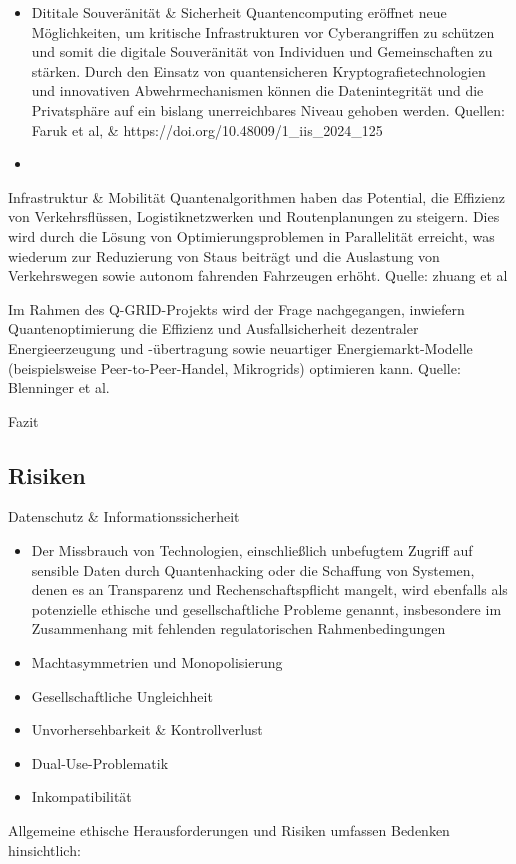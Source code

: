 \begin{itemize}
\begin{itemize}
\end{itemize}
\item Dititale Souveränität & Sicherheit
Quantencomputing eröffnet neue Möglichkeiten, um kritische Infrastrukturen vor Cyberangriffen zu schützen und somit die digitale Souveränität von Individuen und Gemeinschaften zu stärken. Durch den Einsatz von quantensicheren Kryptografietechnologien und innovativen Abwehrmechanismen können die Datenintegrität und die Privatsphäre auf ein bislang unerreichbares Niveau gehoben werden.  Quellen: Faruk et al, & https://doi.org/10.48009/1_iis_2024_125
\item 


\end{itemize}
\item Infrastruktur \& Mobilität
Quantenalgorithmen haben das Potential, die Effizienz von Verkehrsflüssen, Logistiknetzwerken und Routenplanungen zu steigern. Dies wird durch die Lösung von Optimierungsproblemen in Parallelität erreicht, was wiederum zur Reduzierung von Staus beiträgt und die Auslastung von Verkehrswegen sowie autonom fahrenden Fahrzeugen erhöht. Quelle: zhuang et al

Im Rahmen des Q-GRID-Projekts wird der Frage nachgegangen, inwiefern Quantenoptimierung die Effizienz und Ausfallsicherheit dezentraler Energieerzeugung und -übertragung sowie neuartiger Energiemarkt-Modelle (beispielsweise Peer-to-Peer-Handel, Mikrogrids) optimieren kann. Quelle: Blenninger et al. 


\item Fazit


\subsection{Risiken}
Datenschutz \& Informationssicherheit
\begin{itemize}
    \item Der Missbrauch von Technologien, einschließlich unbefugtem Zugriff auf sensible Daten durch Quantenhacking oder die Schaffung von Systemen, denen es an Transparenz und Rechenschaftspflicht mangelt, wird ebenfalls als potenzielle ethische und gesellschaftliche Probleme genannt, insbesondere im Zusammenhang mit fehlenden regulatorischen Rahmenbedingungen \cite{umbrello_quantum_2024}
\end{itemize}
\begin{itemize}
    \item Machtasymmetrien und Monopolisierung
    \item Gesellschaftliche Ungleichheit
    \item Unvorhersehbarkeit \& Kontrollverlust
    \item Dual-Use-Problematik
    \item Inkompatibilität
\end{itemize}
Allgemeine ethische Herausforderungen und Risiken umfassen Bedenken hinsichtlich:

